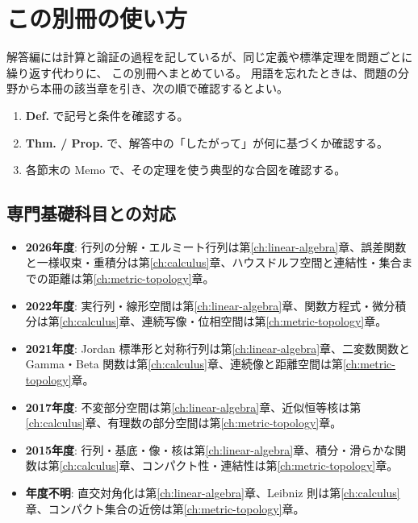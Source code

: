 \chapter{この別冊の使い方}
\label{ch:reference-guide}

解答編には計算と論証の過程を記しているが、同じ定義や標準定理を問題ごとに繰り返す代わりに、
この別冊へまとめている。
用語を忘れたときは、問題の分野から本冊の該当章を引き、次の順で確認するとよい。

\begin{enumerate}
  \item \textbf{Def.} で記号と条件を確認する。
  \item \textbf{Thm. / Prop.} で、解答中の「したがって」が何に基づくか確認する。
  \item 各節末の Memo で、その定理を使う典型的な合図を確認する。
\end{enumerate}

\section{専門基礎科目との対応}

\begin{itemize}
  \item \textbf{2026年度}: 行列の分解・エルミート行列は第\ref{ch:linear-algebra}章、誤差関数と一様収束・重積分は第\ref{ch:calculus}章、ハウスドルフ空間と連結性・集合までの距離は第\ref{ch:metric-topology}章。
  \item \textbf{2022年度}: 実行列・線形空間は第\ref{ch:linear-algebra}章、関数方程式・微分積分は第\ref{ch:calculus}章、連続写像・位相空間は第\ref{ch:metric-topology}章。
  \item \textbf{2021年度}: Jordan 標準形と対称行列は第\ref{ch:linear-algebra}章、二変数関数と Gamma・Beta 関数は第\ref{ch:calculus}章、連続像と距離空間は第\ref{ch:metric-topology}章。
  \item \textbf{2017年度}: 不変部分空間は第\ref{ch:linear-algebra}章、近似恒等核は第\ref{ch:calculus}章、有理数の部分空間は第\ref{ch:metric-topology}章。
  \item \textbf{2015年度}: 行列・基底・像・核は第\ref{ch:linear-algebra}章、積分・滑らかな関数は第\ref{ch:calculus}章、コンパクト性・連結性は第\ref{ch:metric-topology}章。
  \item \textbf{年度不明}: 直交対角化は第\ref{ch:linear-algebra}章、Leibniz 則は第\ref{ch:calculus}章、コンパクト集合の近傍は第\ref{ch:metric-topology}章。
\end{itemize}

